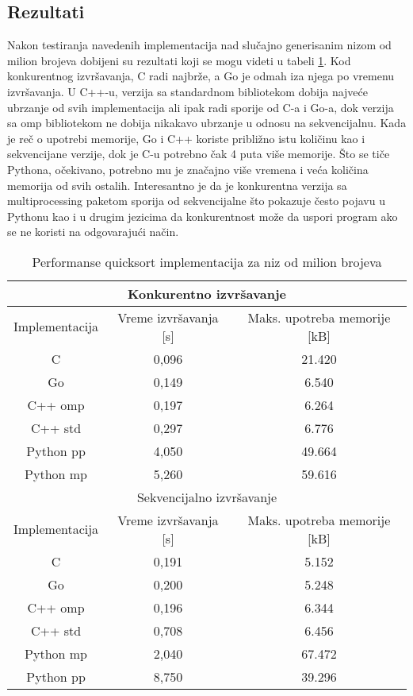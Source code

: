 \documentclass[12pt,oneside]{memoir}
\begin{document}
\subsection{Rezultati}\label{qs:rez}
Nakon testiranja navedenih implementacija nad slučajno generisanim nizom od milion brojeva dobijeni su rezultati koji se mogu videti u tabeli \ref{tab:qs1}.  Kod konkurentnog izvršavanja, C radi najbrže, a Go je odmah iza njega po vremenu izvršavanja. U C++-u, verzija sa standardnom bibliotekom dobija najveće ubrzanje od svih implementacija ali ipak radi sporije od C-a i Go-a, dok verzija sa omp bibliotekom ne dobija nikakavo ubrzanje u odnosu na sekvencijalnu. Kada je reč o upotrebi memorije,  Go i C++ koriste približno istu količinu kao i sekvencijane verzije, dok je C-u potrebno čak 4 puta više memorije. Što se tiče Pythona, očekivano, potrebno mu je značajno više vremena i veća količina memorija od svih ostalih. Interesantno je da je konkurentna verzija sa multiprocessing paketom sporija od sekvencijalne što pokazuje često pojavu u Pythonu kao i u drugim jezicima da konkurentnost može da uspori program ako se ne koristi na odgovarajući način. 

\begin{table}
\begin{center}
\caption{Performanse quicksort implementacija za niz od milion brojeva}
\begin{tabular}{|c|c|c|}
\hline
\multicolumn{3}{|c|}{Konkurentno izvršavanje} \\ \hline
Implementacija &  Vreme izvršavanja [s]& Maks. upotreba memorije [kB]\\ \hline
C 		&  0,096	&  21.420\\ 
Go  		&  0,149	&  6.540\\ 
C++  omp 	&  0,197 	&  6.264\\
C++  std 	&  0,297 	&  6.776\\ 
Python pp  	&  4,050	& 49.664\\ 
Python mp 	&  5,260 	&  59.616\\ \hline
\multicolumn{3}{|c|}{Sekvencijalno izvršavanje} \\ \hline
Implementacija &  Vreme izvršavanja [s] & Maks. upotreba memorije [kB]\\ \hline
C 		& 0,191 	&  5.152\\
Go	 	& 0,200 	&  5.248  \\
C++  omp 	& 0,196  	&  6.344  \\
C++  std 	& 0,708 	&  6.456\\
Python mp  	& 2,040	&  67.472\\ 
Python pp  	& 8,750 	&  39.296\\ \hline
\end{tabular}
\label{tab:qs1}
\end{center}
\end{table}
\end{document}

